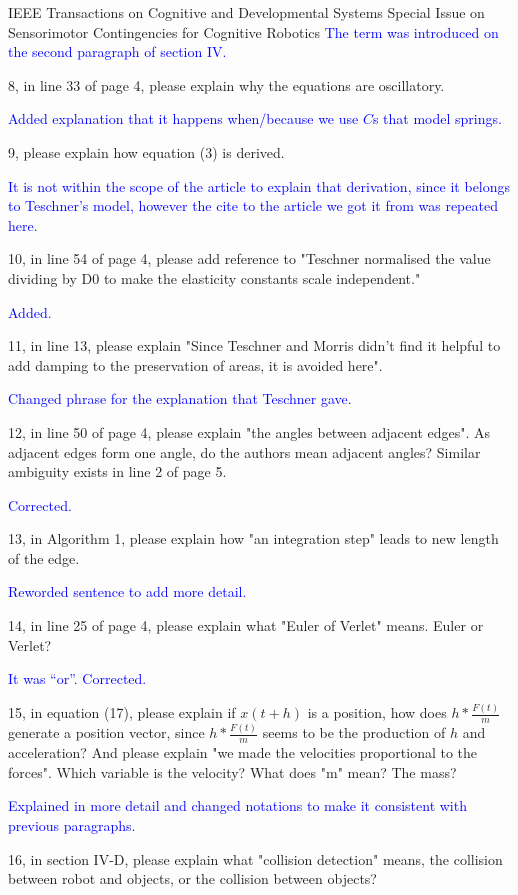 \documentclass[a4paper,12pt]{letter}
\newcommand{\comment}[1]{\textcolor{blue}{#1}}
\begin{document}
\begin{letter}{IEEE Transactions on Cognitive and Developmental Systems\newline
Special Issue on Sensorimotor Contingencies for Cognitive Robotics}
\comment{The term was introduced on the second paragraph of section IV.}

8, in line 33 of page 4, please explain why the equations are oscillatory.

\comment{Added explanation that it happens when/because we use $C$s that model springs.}

9, please explain how equation (3) is derived.

\comment{It is not within the scope of the article to explain that derivation, since it belongs to Teschner's model, however the cite to the article we got it from was repeated here.}

10, in line 54 of page 4, please add reference to "Teschner normalised the value dividing by D0 to make the elasticity constants scale independent." 

\comment{Added.}

11, in line 13, please explain "Since Teschner and Morris didn’t find it helpful to add damping to the preservation of areas, it is avoided here".

\comment{Changed phrase for the explanation that Teschner gave.}

12, in line 50 of page 4, please explain "the angles between adjacent edges". As adjacent edges form one angle, do the authors mean adjacent angles? Similar ambiguity exists in line 2 of page 5. 

\comment{Corrected.}

13, in Algorithm 1, please explain how "an integration step" leads to new length of the edge. 

\comment{Reworded sentence to add more detail.}

14, in line 25 of page 4, please explain what "Euler of Verlet" means. Euler or Verlet? 

\comment{It was ``or''.  Corrected.}

15, in equation (17), please explain if $x(t+h)$ is a position, how does $h*\frac{F(t)}{m}$ generate a position vector, since $h*\frac{F(t)}{m}$ seems to be the production of $h$ and acceleration? And please explain "we made the velocities proportional to the forces". Which variable is the velocity? What does "m" mean? The mass?

\comment{Explained in more detail and changed notations to make it consistent with previous paragraphs.}

16, in section IV-D, please explain what "collision detection" means, the collision between robot and objects, or the collision between objects?


\end{letter}
\end{document}
